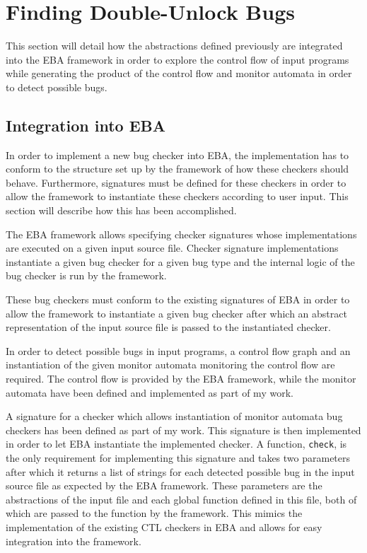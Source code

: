 \section{Finding Double-Unlock Bugs}
This section will detail how the abstractions defined previously are integrated into the EBA framework in order to explore the control flow of input programs while generating the product of the control flow and monitor automata in order to detect possible bugs. 

\subsection{Integration into EBA}
In order to implement a new bug checker into EBA, the implementation has to conform to the structure set up by the framework of how these checkers should behave. Furthermore, signatures must be defined for these checkers in order to allow the framework to instantiate these checkers according to user input. This section will describe how this has been accomplished.  

\newpar The EBA framework allows specifying checker signatures whose implementations are executed on a given input source file. Checker signature implementations instantiate a given bug checker for a given bug type and the internal logic of the bug checker is run by the framework. 

\newpar These bug checkers must conform to the existing signatures of EBA in order to allow the framework to instantiate a given bug checker after which an abstract representation of the input source file is passed to the instantiated checker. 

\newpar In order to detect possible bugs in input programs, a control flow graph and an instantiation of the given monitor automata monitoring the control flow are required. The control flow is provided by the EBA framework, while the monitor automata have been defined and implemented as part of my work.   

\newpar A signature for a checker which allows instantiation of monitor automata bug checkers has been defined as part of my work. This signature is then implemented in order to let EBA instantiate the implemented checker. A function, \texttt{check}, is the only requirement for implementing this signature and takes two parameters after which it returns a list of strings for each detected possible bug in the input source file as expected by the EBA framework. These parameters are the abstractions of the input file and each global function defined in this file, both of which are passed to the function by the framework. This mimics the implementation of the existing CTL checkers in EBA and allows for easy integration into the framework. 

